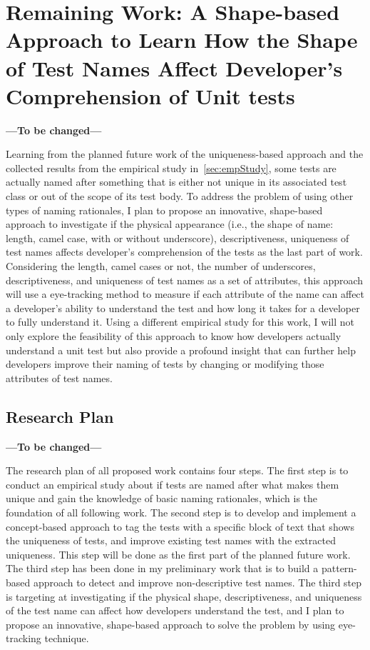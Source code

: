 \section{Remaining Work: A Shape-based Approach to Learn How the Shape of Test Names Affect Developer's Comprehension of Unit tests}
\label{sec:remaining-shape}

\textbf{---To be changed---}

Learning from the planned future work of the uniqueness-based approach and the collected results from the empirical study in~\cref{sec:empStudy}, some tests are actually named after something that is either not unique in its associated test class or out of the scope of its test body.
%
To address the problem of using other types of naming rationales, I plan to propose an innovative, shape-based approach to investigate if the physical appearance (i.e., the shape of name: length, camel case, with or without underscore), descriptiveness, uniqueness of test names affects developer's comprehension of the tests as the last part of work.
%
Considering the length, camel cases or not, the number of underscores, descriptiveness, and uniqueness of test names as a set of attributes, this approach will use a eye-tracking method to measure if each attribute of the name can affect a developer's ability to understand the test and how long it takes for a developer to fully understand it.
%
Using a different empirical study for this work, I will not only explore the feasibility of this approach to know how developers actually understand a unit test but also provide a profound insight that can further help developers improve their naming of tests by changing or modifying those attributes of test names.

\subsection{Research Plan}

\textbf{---To be changed---}

The research plan of all proposed work contains four steps.
%
The first step is to conduct an empirical study about if tests are named after what makes them unique and gain the knowledge of basic naming rationales, which is the foundation of all following work.
%
The second step is to develop and implement a concept-based approach to tag the tests with a specific block of text that shows the uniqueness of tests, and improve existing test names with the extracted uniqueness.
%
This step will be done as the first part of the planned future work.
%
The third step has been done in my preliminary work that is to build a pattern-based approach to detect and improve non-descriptive test names.
%
The third step is targeting at investigating if the physical shape, descriptiveness, and uniqueness of the test name can affect how developers understand the test, and I plan to propose an innovative, shape-based approach to solve the problem by using eye-tracking technique.